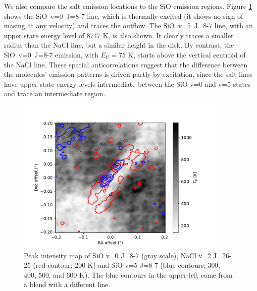 \documentclass[twocolumn]{aastex62}
\newcommand{\bam}[1]{\textcolor{green!65!black}{\textbf{[BAM: #1]}}}
\newcommand{\ag}[1]{\textcolor{red!65!black}{\textbf{[AG: #1]}}}
\begin{document}
We also compare the salt emission locations to the SiO emission regions.
Figure \ref{fig:sioonnacl} shows the \mbox{SiO v=0 J=8-7} line, which is
thermally excited (it shows no sign of masing at any velocity) and traces the
outflow.  The \mbox{SiO v=5 J=8-7} line, with an upper state energy level of
8747 K, is also shown.  It clearly traces a smaller radius than the NaCl line,
but a similar height in the disk.  By contrast, the \mbox{SiO v=0 J=8-7}
emission, with $E_U=75$ K, starts above the vertical centroid of the NaCl line.
These spatial anticorrelations suggest that the difference between the
molecules' emission patterns is driven partly by excitation, since the salt
lines have upper state energy levels intermediate between the SiO v=0 and v=5
states and trace an intermediate region.



\begin{figure}[!htp]
\includegraphics[scale=1,width=4in]{figures/SiO_8-7_on_NaClv=2_26-25.pdf}
\caption{Peak intensity map of SiO v=0 J=8-7 (gray scale), NaCl v=2 J=26-25
(red contour; 200 K) and {SiO v=5 J=8-7} (blue contours; 300, 400, 500, and 600
K).  The blue contours in the upper-left come from a blend with a different
line.
}
\label{fig:sioonnacl}
\end{figure}


\end{document}
